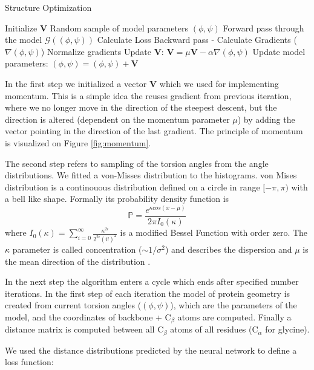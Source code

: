 \begin{algorithm}[ht]
\caption{Structure Optimization}
\label{alg:strucreal_gd}
\begin{algorithmic}[1]
\State Initialize $\bm{V}$
\State Random sample of model parameters $(\phi, \psi)$
    \Repeat
        \State Forward pass through the model $\mathcal{G}((\phi, \psi))$
        \State Calculate Loss
        \State Backward pass - Calculate Gradients ($\nabla (\phi, \psi)$)
        \State Normalize gradients
        \State Update $\bm{V}$: $\bm{V} = \mu \bm{V} - \alpha \nabla (\phi, \psi)$
        \State Update model parameters: $(\phi, \psi) = (\phi, \psi) + \bm{V}$
\end{algorithmic}
\end{algorithm}

In the first step we initialized a vector $\bm{V}$ which we used for implementing momentum. This is a simple idea the reuses gradient from previous iteration, where we no longer move in the direction of the steepest descent, but the direction is altered (dependent on the momentum parameter $\mu$) by adding the vector pointing in the direction of the last gradient. The principle of momentum is visualized on Figure \ref{fig:momentum}.

The second step refers to sampling of the torsion angles from the angle distributions. We fitted a von-Misses distribution to the histograms. von Mises distribution is a continouous distribution defined on a circle in range $[-\pi, \pi)$ with a bell like shape. Formally its probability density function is 
$$\mathds{P} = \frac{e^{\kappa cos(x - \mu)}}{2\pi I_0(\kappa)}$$ 
where $I_0(\kappa) = \sum_{i=0}^\infty \frac{\kappa^{2i}}{2^{2i}(i!)^2}$ is a modified Bessel Function with order zero. 
The $\kappa$ parameter is called concentration ($\sim 1/\sigma^2$) and describes the dispersion and $\mu$ is the mean direction of the distribution \cite{vonmises}. 

In the next step the algorithm enters a cycle which ends after specified number iterations. In the first step of each iteration the model of protein geometry is created from current torsion angles ($(\phi, \psi)$), which are the parameters of the model, and the coordinates of backbone + C$_\beta$ atoms are computed. Finally a distance matrix is computed between all C$_\beta$ atoms of all residues (C$_\alpha$ for glycine).

We used the distance distributions predicted by the neural network to define a loss function:

